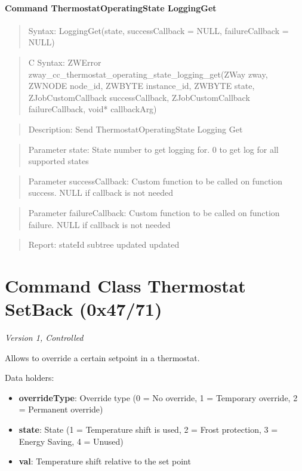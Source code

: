 \paragraph{Command ThermostatOperatingState LoggingGet}
\begin{quote}Syntax: LoggingGet(state, successCallback = NULL, failureCallback = NULL)\end{quote}
\begin{quote}C Syntax: ZWError zway\_cc\_thermostat\_operating\_state\_logging\_get(ZWay zway, ZWNODE node\_id, ZWBYTE instance\_id, ZWBYTE state, ZJobCustomCallback successCallback, ZJobCustomCallback failureCallback, void* callbackArg)\end{quote}
\begin{quote}Description: Send ThermostatOperatingState Logging Get\end{quote}
\begin{quote}Parameter state: State number to get logging for. 0 to get log for all supported states\end{quote}
\begin{quote}Parameter successCallback: Custom function to be called on function success. NULL if callback is not needed\end{quote}
\begin{quote}Parameter failureCallback: Custom function to be called on function failure. NULL if callback is not needed\end{quote}
\begin{quote}Report: stateId subtree updated updated\end{quote}


\section{Command Class Thermostat SetBack (0x47/71)}

\textit{Version 1, Controlled}
\newline

Allows to override a certain setpoint in a thermostat.
\newline

\noindent
Data holders:

\begin{itemize}
\item \textbf{overrideType}: Override type (0 = No override, 1 = Temporary override, 2 = Permanent override)
\item \textbf{state}: State (1 = Temperature shift is used, 2 = Frost protection, 3 = Energy Saving, 4 = Unused)
\item \textbf{val}: Temperature shift relative to the set point
\end{itemize}

